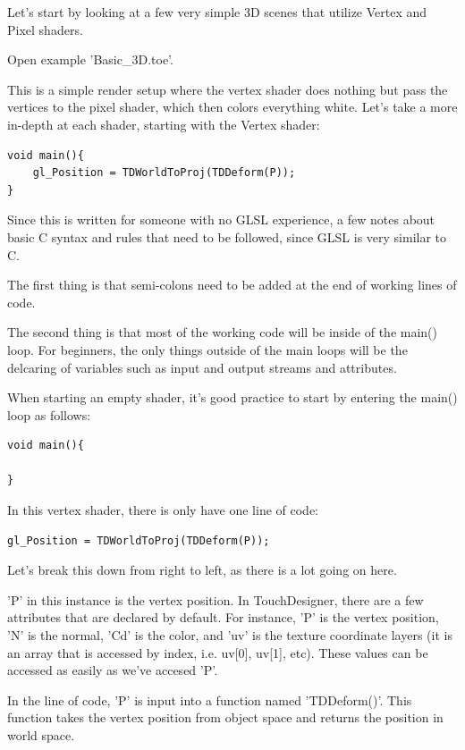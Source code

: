 \begin{fullwidth}
Let's start by looking at a few very simple 3D scenes that utilize Vertex and Pixel shaders.

Open example 'Basic\_3D.toe'.

This is a simple render setup where the vertex shader does nothing but pass the vertices to the pixel shader, which then colors everything white. Let's take a more in-depth at each shader, starting with the Vertex shader:

\begin{lstlisting}
void main(){
	gl_Position = TDWorldToProj(TDDeform(P));
}
\end{lstlisting}

Since this is written for someone with no GLSL experience, a few notes about basic C syntax and rules that need to be followed, since GLSL is very similar to C.

The first thing is that semi-colons need to be added at the end of working lines of code.

The second thing is that most of the working code will be inside of the main() loop. For beginners, the only things outside of the main loops will be the delcaring of variables such as input and output streams and attributes.

When starting an empty shader, it's good practice to start by entering the main() loop as follows:

\begin{lstlisting}
void main(){

}
\end{lstlisting}

In this vertex shader, there is only have one line of code:

\begin{lstlisting}
gl_Position = TDWorldToProj(TDDeform(P));
\end{lstlisting}

Let's break this down from right to left, as there is a lot going on here.

'P' in this instance is the vertex position. In TouchDesigner, there are a few attributes that are declared by default. For instance, 'P' is the vertex position, 'N' is the normal, 'Cd' is the color, and 'uv' is the texture coordinate layers (it is an array that is accessed by index, i.e. uv[0], uv[1], etc). These values can be accessed as easily as we've accesed 'P'.

In the line of code, 'P' is input into a function named 'TDDeform()'. This function takes the vertex position from object space and returns the position in world space.


\end{fullwidth}
